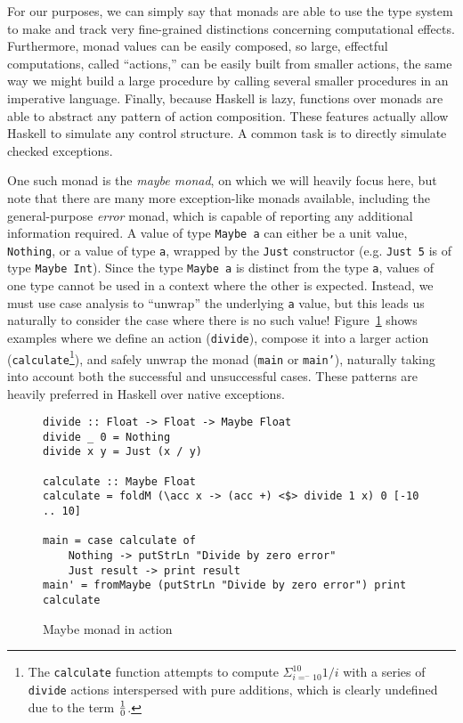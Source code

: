 \documentclass[11pt]{article}
\begin{document}
For our purposes, we can simply say that monads are able to use the type system to make and track very fine-grained distinctions concerning computational effects.
Furthermore, monad values can be easily composed, so large, effectful computations, called ``actions,'' can be easily built from smaller actions, the same way we might build a large procedure by calling several smaller procedures in an imperative language.
Finally, because Haskell is lazy, functions over monads are able to abstract any pattern of action composition.
These features actually allow Haskell to simulate any control structure.
A common task is to directly simulate checked exceptions.

One such monad is the \emph{maybe monad}, on which we will heavily focus here, but note that there are many more exception-like monads available, including the general-purpose \emph{error} monad, which is capable of reporting any additional information required.
A value of type \texttt{Maybe a} can either be a unit value, \texttt{Nothing}, or a value of type \texttt{a}, wrapped by the \texttt{Just} constructor (e.g. \texttt{Just 5} is of type \texttt{Maybe Int}).
Since the type \texttt{Maybe a} is distinct from the type \texttt{a}, values of one type cannot be used in a context where the other is expected.
Instead, we must use case analysis to ``unwrap'' the underlying \texttt{a} value, but this leads us naturally to consider the case where there is no such value!
Figure~\ref{maybeMonad} shows examples where we define an action (\texttt{divide}), compose it into a larger action (\texttt{calculate}\footnote{The \texttt{calculate} function attempts to compute $\Sigma_{i=^-10}^{10}{1/i}$ with a series of \texttt{divide} actions interspersed with pure additions, which is clearly undefined due to the term $1\over0$.}), and safely unwrap the monad (\texttt{main} or \texttt{main'}), naturally taking into account both the successful and unsuccessful cases.
These patterns are heavily preferred in Haskell over native exceptions.

\begin{figure}[h]
\caption{Maybe monad in action}
\label{maybeMonad}
\begin{verbatim}
divide :: Float -> Float -> Maybe Float
divide _ 0 = Nothing
divide x y = Just (x / y)

calculate :: Maybe Float
calculate = foldM (\acc x -> (acc +) <$> divide 1 x) 0 [-10 .. 10]

main = case calculate of
    Nothing -> putStrLn "Divide by zero error"
    Just result -> print result
main' = fromMaybe (putStrLn "Divide by zero error") print calculate
\end{verbatim}
\end{figure}
\end{document}
